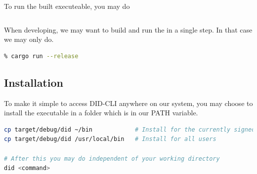 To run the built executeable, you may do

\begin{lstlisting}[language=bash]
% ./target/debug/did
\end{lstlisting}

When developing, we may want to build and run the in a single step. In
that case we may only do.

\begin{lstlisting}[language=bash]
% cargo run
% cargo run --release
\end{lstlisting}

\hypertarget{installation}{%
\subsection{Installation}\label{installation}}

To make it simple to access DID-CLI anywhere on our system, you may
choose to install the executable in a folder which is in our PATH
variable.

\begin{lstlisting}[language=bash]
cp target/debug/did ~/bin            # Install for the currently signed in user
cp target/debug/did /usr/local/bin   # Install for all users

# After this you may do independent of your working directory
did <command>
\end{lstlisting}
